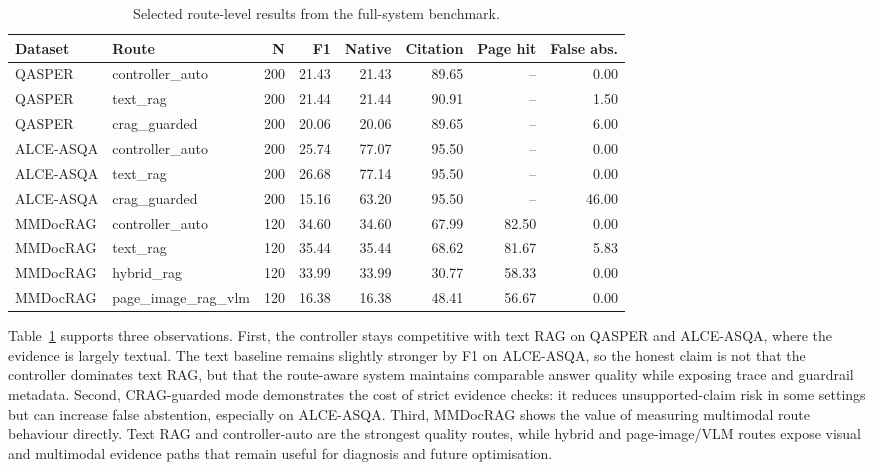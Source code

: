 \begin{table}[t]
\centering
\small
\begin{tabular}{llrrrrrr}
\toprule
\rowcolor{gray!15}
Dataset & Route & N & F1 & Native & Citation & Page hit & False abs. \\
\midrule
QASPER & controller\_auto & 200 & 21.43 & 21.43 & 89.65 & -- & 0.00 \\
QASPER & text\_rag & 200 & 21.44 & 21.44 & 90.91 & -- & 1.50 \\
QASPER & crag\_guarded & 200 & 20.06 & 20.06 & 89.65 & -- & 6.00 \\
\midrule
ALCE-ASQA & controller\_auto & 200 & 25.74 & 77.07 & 95.50 & -- & 0.00 \\
ALCE-ASQA & text\_rag & 200 & 26.68 & 77.14 & 95.50 & -- & 0.00 \\
ALCE-ASQA & crag\_guarded & 200 & 15.16 & 63.20 & 95.50 & -- & 46.00 \\
\midrule
MMDocRAG & controller\_auto & 120 & 34.60 & 34.60 & 67.99 & 82.50 & 0.00 \\
MMDocRAG & text\_rag & 120 & 35.44 & 35.44 & 68.62 & 81.67 & 5.83 \\
MMDocRAG & hybrid\_rag & 120 & 33.99 & 33.99 & 30.77 & 58.33 & 0.00 \\
MMDocRAG & page\_image\_rag\_vlm & 120 & 16.38 & 16.38 & 48.41 & 56.67 & 0.00 \\
\bottomrule
\end{tabular}
\caption{Selected route-level results from the full-system benchmark.}
\label{tab:main-results}
\end{table}

Table~\ref{tab:main-results} supports three observations. First, the controller stays competitive with text RAG on QASPER and ALCE-ASQA, where the evidence is largely textual. The text baseline remains slightly stronger by F1 on ALCE-ASQA, so the honest claim is not that the controller dominates text RAG, but that the route-aware system maintains comparable answer quality while exposing trace and guardrail metadata. Second, CRAG-guarded mode demonstrates the cost of strict evidence checks: it reduces unsupported-claim risk in some settings but can increase false abstention, especially on ALCE-ASQA. Third, MMDocRAG shows the value of measuring multimodal route behaviour directly. Text RAG and controller-auto are the strongest quality routes, while hybrid and page-image/VLM routes expose visual and multimodal evidence paths that remain useful for diagnosis and future optimisation.


